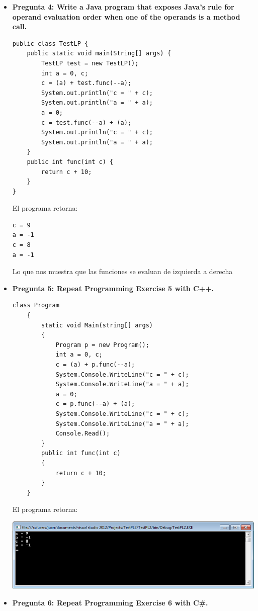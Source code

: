 \documentclass[12pt,oneside]{article}
\begin{document}
\begin{itemize}
				\item {\bf Pregunta 4: Write a Java program that exposes Java’s rule for operand evaluation order when one of the operands is a method call.}
\begin{lstlisting}[frame=single]
public class TestLP {
    public static void main(String[] args) {
        TestLP test = new TestLP();
        int a = 0, c;
        c = (a) + test.func(--a);
        System.out.println("c = " + c);
        System.out.println("a = " + a);
        a = 0;
        c = test.func(--a) + (a);
        System.out.println("c = " + c);
        System.out.println("a = " + a);
    }
    public int func(int c) {
        return c + 10;
    }
}
\end{lstlisting}
					El programa retorna:
\begin{lstlisting}[frame=single]
c = 9
a = -1
c = 8
a = -1
\end{lstlisting}
					Lo que nos muestra que las funciones se evaluan de izquierda a derecha
				\item {\bf Pregunta 5: Repeat Programming Exercise 5 with C++.}
					\lstset{language =[Sharp] C} 
					\begin{lstlisting}[frame=single]
class Program
    {
        static void Main(string[] args)
        {
            Program p = new Program();
            int a = 0, c;
            c = (a) + p.func(--a);
            System.Console.WriteLine("c = " + c);
            System.Console.WriteLine("a = " + a);
            a = 0;
            c = p.func(--a) + (a);
            System.Console.WriteLine("c = " + c);
            System.Console.WriteLine("a = " + a);
            Console.Read();
        }
        public int func(int c)
        {
            return c + 10;
        }
    }
					\end{lstlisting}
					El programa retorna:	
						\begin{center}
							\includegraphics[scale=0.8]{Imagenes/c7-02}								
						\end{center}

				\item {\bf Pregunta 6: Repeat Programming Exercise 6 with C\#.}


\end{itemize}
\end{document}
